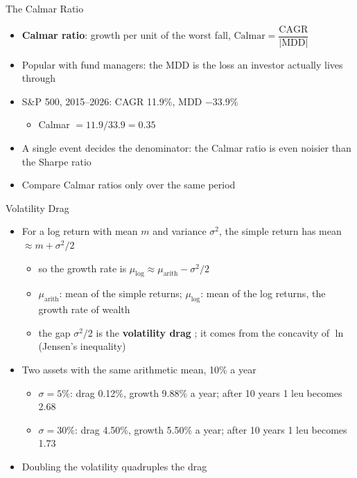 \begin{frame}{The Calmar Ratio}
\itemsize{\small}
\begin{itemize}
    \item \textbf{Calmar ratio}: growth per unit of the worst fall, $\text{Calmar} = \dfrac{\text{CAGR}}{|\text{MDD}|}$
    \item Popular with fund managers: the MDD is the loss an investor actually lives through
    \item S\&P 500, 2015--2026: CAGR 11.9\%, MDD $-33.9\%$
    \begin{itemize}
        \item Calmar $= 11.9/33.9 = 0.35$
    \end{itemize}
    \item A single event decides the denominator: the Calmar ratio is even noisier than the Sharpe ratio
    \item Compare Calmar ratios only over the same period
\end{itemize}
\end{frame}

\begin{frame}{Volatility Drag}
\itemsize{\small}
\begin{itemize}
    \item For a log return with mean $m$ and variance $\sigma^2$, the simple return has mean $\approx m + \sigma^2/2$
    \begin{itemize}
        \item so the growth rate is $\mu_{\text{log}} \approx \mu_{\text{arith}} - \sigma^2/2$
        \item $\mu_{\text{arith}}$: mean of the simple returns; $\mu_{\text{log}}$: mean of the log returns, the growth rate of wealth
        \item the gap $\sigma^2/2$ is the \textbf{volatility drag} ; it comes from the concavity of $\ln$ (Jensen's inequality)
    \end{itemize}
    \item Two assets with the same arithmetic mean, 10\% a year
    \begin{itemize}
        \item $\sigma = 5\%$: drag 0.12\%, growth 9.88\% a year; after 10 years 1 leu becomes 2.68
        \item $\sigma = 30\%$: drag 4.50\%, growth 5.50\% a year; after 10 years 1 leu becomes 1.73
    \end{itemize}
    \item Doubling the volatility quadruples the drag
\end{itemize}
\end{frame}

